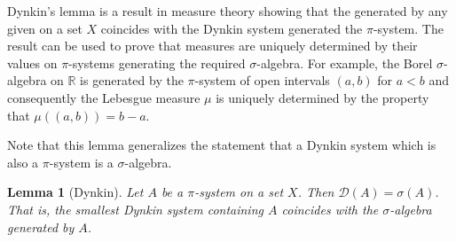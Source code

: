 \documentclass[12pt]{article}
\newtheorem*{lemma}{Lemma}
\begin{document}
Dynkin's lemma is a result in measure theory showing that the  generated by any given  on a set $X$ coincides with the Dynkin system generated the $\pi$-system. The result can be used to prove that measures are uniquely determined by their values on $\pi$-systems generating the required $\sigma$-algebra. For example, the Borel $\sigma$-algebra on $\mathbb{R}$ is generated by the $\pi$-system of open intervals $(a,b)$ for $a<b$ and consequently the Lebesgue measure $\mu$ is uniquely determined by the property that $\mu( (a,b) )=b-a$.

Note that this lemma generalizes the statement that a Dynkin system which is also a $\pi$-system is a $\sigma$-algebra.


\begin{lemma}[Dynkin]
Let $A$ be a $\pi$-system on a set $X$. Then $\mathcal{D}(A)=\sigma(A)$. That is, the smallest Dynkin system containing $A$ coincides with the $\sigma$-algebra generated by $A$.
\end{lemma}
\end{document}
